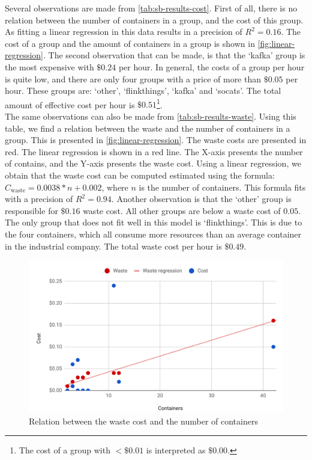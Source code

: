 \noindent
Several observations are made from \autoref{tab:sb-results-cost}. First of all, there is no relation between the number of containers in a group, and the cost of this group. As fitting a linear regression in this data results in a precision of $R^2 = 0.16$. The cost of a group and the amount of containers in a group is shown in \autoref{fig:linear-regression}. The second observation that can be made, is that the `kafka' group is the most expensive with $\$ 0.24$ per hour. In general, the costs of a group per hour is quite low, and there are only four groups with a price of more than $\$0.05$ per hour. These groups are: `other', `flinkthings', `kafka' and `socats'. The total amount of effective cost per hour is $\$0.51$\footnote{The cost of a group with $<\$0.01$ is interpreted as $\$0.00$.}.\\

\noindent
The same observations can also be made from \autoref{tab:sb-results-waste}. Using this table, we find a relation between the waste and the number of containers in a group. This is presented in \autoref{fig:linear-regression}. The waste costs are presented in red. The linear regression is shown in a red line. The X-axis presents the number of contains, and the Y-axis presents the waste cost. Using a linear regression, we obtain that the waste cost can be computed estimated using the formula: $C_\text{waste} = 0.0038*n + 0.002$, where $n$ is the number of containers. This formula fits with a precision of $R^2 = 0.94$. Another observation is that the `other' group is responsible for $\$0.16$ waste cost. All other groups are below a waste cost of $0.05$. The only group that does not fit well in this model is `flinkthings'. This is due to the four containers, which all consume more resources than an average container in the industrial company. The total waste cost per hour is $\$0.49$.\\


\begin{figure}
    \centering
    \includegraphics[width=\textwidth]{gfx/linear-regression.png}
    \caption{Relation between the waste cost and the number of containers}
    \label{fig:linear-regression}
\end{figure}

